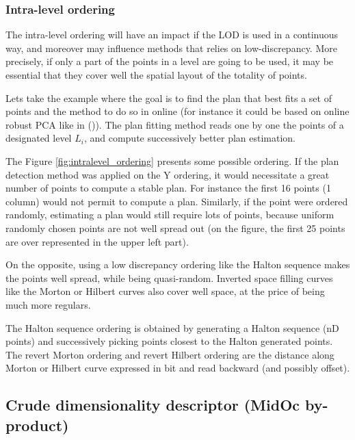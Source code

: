 		\subsubsection{Intra-level ordering}
		\label{method.intralevel}
		
		
		The intra-level ordering will have an impact if the LOD is used in a continuous way,
		and moreover may influence methods that relies on low-discrepancy.
		More precisely, if only a part of the points in a level are going to be used,
		it may be essential that they cover well the spatial layout of the totality of points.
		
		Lets take the example where the goal is to find the plan that best fits a set of points
		and the method to do so in online (for instance it could be based on online robust PCA like in (\cite{Feng2013})).
		The plan fitting method reads one by one the points of a designated level $L_i$, and compute successively better plan estimation.
		
		The Figure \ref{fig:intralevel_ordering} presents some possible ordering. 
		If the plan detection method was applied on the Y ordering, it would necessitate a great number of points to compute a stable plan. For instance the first 16 points (1 column) would not permit to compute a plan.
		Similarly, if the point were ordered randomly, estimating a plan would still require lots of points, because uniform randomly chosen points are not well spread out (on the figure, the first 25 points are over represented in the upper left part).
		
		On the opposite, using a low discrepancy ordering like the Halton sequence makes the points well spread, while being quasi-random.
		Inverted space filling curves like the Morton or Hilbert curves also cover well space, at the price of being much more regulars.
		
		The Halton sequence ordering is obtained by generating a Halton sequence (nD points) and successively picking points closest to the Halton generated points.
		The revert Morton ordering and revert Hilbert ordering are the distance along Morton or Hilbert curve expressed in bit and read backward (and possibly offset).
		

	\subsection{Crude dimensionality descriptor (MidOc by-product)} 
		\label{method.dimdescriptor}
